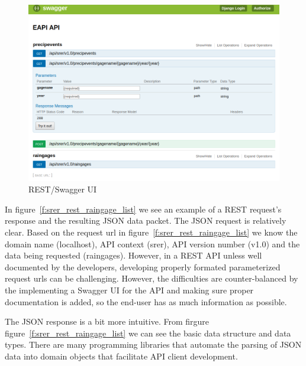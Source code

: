 \begin{figure}[htb]
  \centering\includegraphics[width=\columnwidth]{./images/rest_swagger_ui.png}
  \caption{REST/Swagger UI}\label{f:rest_swagger_ui}
\end{figure}

In figure~\ref{f:srer_rest_raingage_list} we see an example of a REST 
request's response and the resulting JSON data packet.  The JSON request is 
relatively clear.  Based on the request url in 
figure~\ref{f:srer_rest_raingage_list} we know the domain name (localhost), 
API context (srer), API version number (v1.0) and the data being requested 
(raingages).  However, in a REST API unless well documented by the developers, 
developing properly formated parameterized request urls can be challenging.  
However, the difficulties are counter-balanced by the implementing a Swagger 
UI for the API and making sure proper documentation is added, so the end-user 
has as much information as possible.

The JSON response is a bit more intuitive.  From firgure 
figure~\ref{f:srer_rest_raingage_list} we can see the basic data structure and 
data types.  There are many programming libraries that automate the parsing of 
JSON data into domain objects that facilitate API client development.

